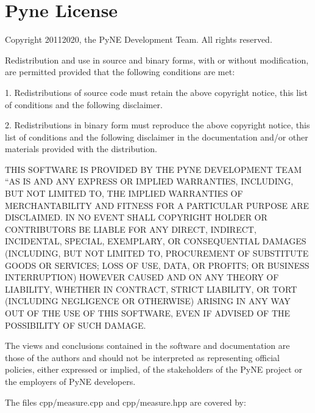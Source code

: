 \documentclass[letterpaper,10pt,english]{sphinxmanual}
\begin{document}
\section{Pyne License}
\label{\detokenize{LICENSE:pyne-license}}\label{\detokenize{LICENSE:pynelicense}}
\begin{sphinxVerbatim}[commandchars=\\\{\}]
Copyright 2011\PYGZhy{}2020, the PyNE Development Team. All rights reserved.

Redistribution and use in source and binary forms, with or without modification, are
permitted provided that the following conditions are met:

   1. Redistributions of source code must retain the above copyright notice, this list of
      conditions and the following disclaimer.

   2. Redistributions in binary form must reproduce the above copyright notice, this list
      of conditions and the following disclaimer in the documentation and/or other materials
      provided with the distribution.

THIS SOFTWARE IS PROVIDED BY THE PYNE DEVELOPMENT TEAM ``AS IS\PYGZsq{}\PYGZsq{} AND ANY EXPRESS OR IMPLIED
WARRANTIES, INCLUDING, BUT NOT LIMITED TO, THE IMPLIED WARRANTIES OF MERCHANTABILITY AND
FITNESS FOR A PARTICULAR PURPOSE ARE DISCLAIMED. IN NO EVENT SHALL \PYGZlt{}COPYRIGHT HOLDER\PYGZgt{} OR
CONTRIBUTORS BE LIABLE FOR ANY DIRECT, INDIRECT, INCIDENTAL, SPECIAL, EXEMPLARY, OR
CONSEQUENTIAL DAMAGES (INCLUDING, BUT NOT LIMITED TO, PROCUREMENT OF SUBSTITUTE GOODS OR
SERVICES; LOSS OF USE, DATA, OR PROFITS; OR BUSINESS INTERRUPTION) HOWEVER CAUSED AND ON
ANY THEORY OF LIABILITY, WHETHER IN CONTRACT, STRICT LIABILITY, OR TORT (INCLUDING
NEGLIGENCE OR OTHERWISE) ARISING IN ANY WAY OUT OF THE USE OF THIS SOFTWARE, EVEN IF
ADVISED OF THE POSSIBILITY OF SUCH DAMAGE.

The views and conclusions contained in the software and documentation are those of the
authors and should not be interpreted as representing official policies, either expressed
or implied, of the stakeholders of the PyNE project or the employers of PyNE developers.

\PYGZhy{}\PYGZhy{}\PYGZhy{}\PYGZhy{}\PYGZhy{}\PYGZhy{}\PYGZhy{}\PYGZhy{}\PYGZhy{}\PYGZhy{}\PYGZhy{}\PYGZhy{}\PYGZhy{}\PYGZhy{}\PYGZhy{}\PYGZhy{}\PYGZhy{}\PYGZhy{}\PYGZhy{}\PYGZhy{}\PYGZhy{}\PYGZhy{}\PYGZhy{}\PYGZhy{}\PYGZhy{}\PYGZhy{}\PYGZhy{}\PYGZhy{}\PYGZhy{}\PYGZhy{}\PYGZhy{}\PYGZhy{}\PYGZhy{}\PYGZhy{}\PYGZhy{}\PYGZhy{}\PYGZhy{}\PYGZhy{}\PYGZhy{}\PYGZhy{}\PYGZhy{}\PYGZhy{}\PYGZhy{}\PYGZhy{}\PYGZhy{}\PYGZhy{}\PYGZhy{}\PYGZhy{}\PYGZhy{}\PYGZhy{}\PYGZhy{}\PYGZhy{}\PYGZhy{}\PYGZhy{}\PYGZhy{}\PYGZhy{}\PYGZhy{}\PYGZhy{}\PYGZhy{}\PYGZhy{}\PYGZhy{}\PYGZhy{}\PYGZhy{}\PYGZhy{}\PYGZhy{}\PYGZhy{}\PYGZhy{}\PYGZhy{}\PYGZhy{}\PYGZhy{}\PYGZhy{}\PYGZhy{}\PYGZhy{}\PYGZhy{}\PYGZhy{}\PYGZhy{}\PYGZhy{}\PYGZhy{}\PYGZhy{}
The files cpp/measure.cpp and cpp/measure.hpp are covered by:


\end{sphinxVerbatim}
\end{document}
